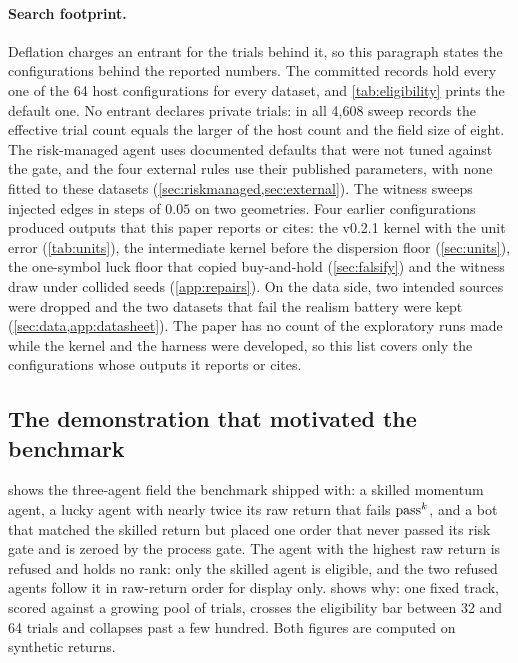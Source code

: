 \paragraph{Search footprint.} Deflation charges an entrant for the trials behind it, so this paragraph states the configurations behind the reported numbers. The committed records hold every one of the 64 host configurations for every dataset, and \cref{tab:eligibility} prints the default one. No entrant declares private trials: in all 4{,}608 sweep records the effective trial count equals the larger of the host count and the field size of eight. The risk-managed agent uses documented defaults that were not tuned against the gate, and the four external rules use their published parameters, with none fitted to these datasets (\cref{sec:riskmanaged,sec:external}). The witness sweeps injected edges in steps of $0.05$ on two geometries. Four earlier configurations produced outputs that this paper reports or cites: the v0.2.1 kernel with the unit error (\cref{tab:units}), the intermediate kernel before the dispersion floor (\cref{sec:units}), the one-symbol luck floor that copied buy-and-hold (\cref{sec:falsify}) and the witness draw under collided seeds (\cref{app:repairs}). On the data side, two intended sources were dropped and the two datasets that fail the realism battery were kept (\cref{sec:data,app:datasheet}). The paper has no count of the exploratory runs made while the kernel and the harness were developed, so this list covers only the configurations whose outputs it reports or cites.

\subsection{The demonstration that motivated the benchmark}\label{sec:demo}

 shows the three-agent field the benchmark shipped with: a skilled momentum agent, a lucky agent with nearly twice its raw return that fails $\text{pass}^{k}$, and a bot that matched the skilled return but placed one order that never passed its risk gate and is zeroed by the process gate. The agent with the highest raw return is refused and holds no rank: only the skilled agent is eligible, and the two refused agents follow it in raw-return order for display only.  shows why: one fixed track, scored against a growing pool of trials, crosses the eligibility bar between 32 and 64 trials and collapses past a few hundred. Both figures are computed on synthetic returns.


